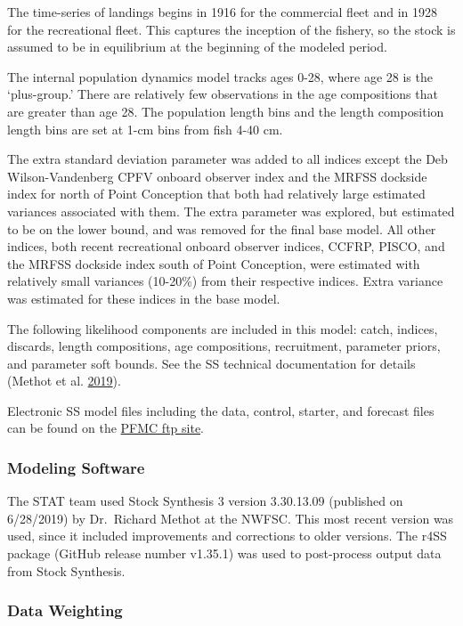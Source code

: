 \documentclass[12pt,]{article}
\begin{document}
The time-series of landings begins in 1916 for the commercial fleet and
in 1928 for the recreational fleet. This captures the inception of the
fishery, so the stock is assumed to be in equilibrium at the beginning
of the modeled period.

The internal population dynamics model tracks ages 0-28, where age 28 is
the `plus-group.' There are relatively few observations in the age
compositions that are greater than age 28. The population length bins
and the length composition length bins are set at 1-cm bins from fish
4-40 cm.

The extra standard deviation parameter was added to all indices except
the Deb Wilson-Vandenberg CPFV onboard observer index and the MRFSS
dockside index for north of Point Conception that both had relatively
large estimated variances associated with them. The extra parameter was
explored, but estimated to be on the lower bound, and was removed for
the final base model. All other indices, both recent recreational
onboard observer indices, CCFRP, PISCO, and the MRFSS dockside index
south of Point Conception, were estimated with relatively small
variances (10-20\%) from their respective indices. Extra variance was
estimated for these indices in the base model.

The following likelihood components are included in this model: catch,
indices, discards, length compositions, age compositions, recruitment,
parameter priors, and parameter soft bounds. See the SS technical
documentation for details (Methot et al.
\protect\hyperlink{ref-Methot2019}{2019}).

Electronic SS model files including the data, control, starter, and
forecast files can be found on the
\href{ftp://ftp.pcouncil.org/pub/!2019\%20GF\%20STAR\%20Panels/STAR\%20Panel\%204\%20-\%20Cowcod-Gopher/}{PFMC
ftp site}.

\subsubsection{Modeling Software}\label{modeling-software}

The STAT team used Stock Synthesis 3 version 3.30.13.09 (published on
6/28/2019) by Dr.~Richard Methot at the NWFSC. This most recent version
was used, since it included improvements and corrections to older
versions. The r4SS package (GitHub release number v1.35.1) was used to
post-process output data from Stock Synthesis.

\subsubsection{Data Weighting}\label{data-weighting}
\end{document}
